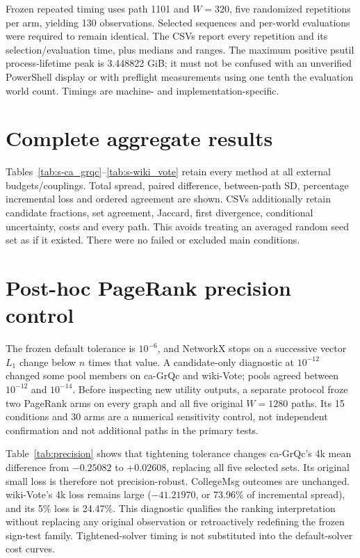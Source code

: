 \documentclass[smallextended]{svjour3}
\begin{document}
Frozen repeated timing uses path 1101 and $W=320$, five randomized repetitions
per arm, yielding 130 observations. Selected sequences and per-world evaluations
were required to remain identical. The CSVs report every repetition and its
selection/evaluation time, plus medians and ranges. The maximum positive psutil
process-lifetime peak is 3.448822 GiB; it must not be confused with an unverified
PowerShell display or with preflight measurements using one tenth the evaluation
world count. Timings are machine- and implementation-specific.

\section{Complete aggregate results}
Tables~\ref{tab:s-ca_grqc}--\ref{tab:s-wiki_vote} retain every method at all external
budgets/couplings. Total spread, paired difference, between-path SD, percentage
incremental loss and ordered agreement are shown. CSVs additionally retain
candidate fractions, set agreement, Jaccard, first divergence, conditional
uncertainty, costs and every path. This avoids treating an averaged random seed
set as if it existed. There were no failed or excluded main conditions.

\FloatBarrier
\section{Post-hoc PageRank precision control}
The frozen default tolerance is $10^{-6}$, and NetworkX stops on a successive
vector $L_1$ change below $n$ times that value. A candidate-only diagnostic at
$10^{-12}$ changed some pool members on ca-GrQc and wiki-Vote; pools agreed
between $10^{-12}$ and $10^{-14}$. Before inspecting new utility outputs, a
separate protocol froze two PageRank arms on every graph and all five original
$W=1280$ paths. Its 15 conditions and 30 arms are a numerical sensitivity control,
not independent confirmation and not additional paths in the primary tests.

Table~\ref{tab:precision} shows that tightening tolerance changes ca-GrQc's 4k
mean difference from $-0.25082$ to $+0.02608$, replacing all five selected sets.
Its original small loss is therefore not precision-robust. CollegeMsg outcomes
are unchanged. wiki-Vote's 4k loss remains large ($-41.21970$, or 73.96\% of
incremental spread), and its 5\% loss is 24.47\%. This diagnostic qualifies the
ranking interpretation without replacing any original observation or retroactively
redefining the frozen sign-test family. Tightened-solver timing is not substituted
into the default-solver cost curves.

\FloatBarrier
\end{document}

